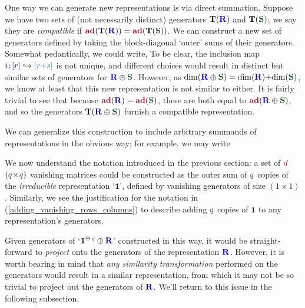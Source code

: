 \documentclass[12pt,a4paper]{article}\let\ifpdf\relax
\begin{document}
One way we can generate new representations is via direct summation. Suppose we have two sets of (not necessarily distinct) generators $\mathbf{T}(\mathbf{\b{R}})$ and $\mathbf{T}(\mathbf{\g{S}})$; we say they are \emph{compatible} if $\mathbf{\r{ad}}(\mathbf{T}(\mathbf{\b{R}}))=\mathbf{\r{ad}}(\mathbf{T}(\mathbf{\g{S}}))$. We can construct a new set of generators defined by taking the block-diagonal `outer' sums of their generators. Somewhat pedantically, we could write,
%
%
To be clear, the inclusion map $i\!:\!\b{[r]}\hookrightarrow\t{[r{+}s]}$ is not unique, and different choices would result in distinct but similar sets of generators for $\mathbf{\b{R}}\oplus\mathbf{\g{S}}$. However, as $\mathrm{dim}(\mathbf{\b{R}}\oplus\mathbf{\g{S}})=\mathrm{dim}(\mathbf{\b{R}}){+}\mathrm{dim}(\mathbf{\g{S}})$, we know at least that this new representation is not similar to either. It is fairly trivial to see that because $\mathbf{\r{ad}}(\mathbf{\b{R}})=\mathbf{\r{ad}}(\mathbf{\g{S}})$, these are both equal to $\mathbf{\r{ad}}(\mathbf{\b{R}}\oplus\mathbf{\g{S}})$, and so the generators $\mathbf{T}(\mathbf{\b{R}}\oplus\mathbf{\g{S}})$ furnish a compatible representation.

We can generalize this construction to include arbitrary summands of representations in the obvious way; for example, we may write
%
%

We now understand the notation introduced in the previous section: a set of $\r{d}$ $(\g{q}\!\times\!\g{q})$ vanishing matrices could be constructed as the outer sum of $\g{q}$ copies of the \emph{irreducible} representation `$\mathbf{1}$', defined by vanishing generators of size $(1\!\times\!1)$. Similarly, we see the justification for the notation in (\ref{adding_vanishing_rows_columns}) to describe adding $\g{q}$ copies of $\mathbf{1}$ to any representation's generators. 


Given generators of `$\mathbf{1}^{\oplus\,\g{q}}\oplus\mathbf{\b{R}}$' constructed in this way, it would be straight-forward to \emph{project} onto the generators of the representation $\mathbf{\b{R}}$. However, it is worth bearing in mind that \emph{any similarity transformation} performed on the generators would result in a similar representation, from which it may not be so trivial to project out the generators of $\mathbf{\b{R}}$. We'll return to this issue in the following subsection.\\[-10pt]
\end{document}
